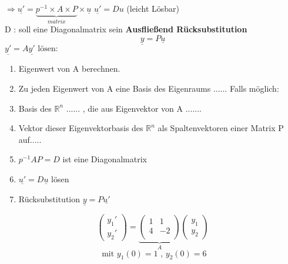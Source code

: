 $\Rightarrow \underline{u'} = 
\underbrace{p^{-1} \times A \times P}_{matrix} \times \underline{u} $
$\underline{u'} = D u$ (leicht Lösbar) \\
D : soll eine Diagonalmatrix sein
\textbf{Ausfließend Rücksubstitution}\\
$$\underline{y} = P \underline{u} $$
$ \underline{y'} = A \underline{y'} \text{ lösen: } $
\begin{enumerate}
\item Eigenwert von A berechnen.
\item Zu jeden Eigenwert von A eine Basis des Eigenraums ...... Falls möglich:
\item Basis des $\mathbb{R}^n$ ...... , die aus Eigenvektor von A .......
\item Vektor dieser Eigenvektorbasis  des $\mathbb{R}^n$ als Spaltenvektoren einer Matrix P auf.....
\item $p^{-1}AP=D$ ist eine Diagonalmatrix 
\item $\underline{u'} = D \underline{u}$ lösen
\item  Rücksubstitution $\underline{y} = P \underline{u'}$
\end{enumerate}
\begin{example}
\[
\begin{pmatrix}
y_1'\\
y_2'
\end{pmatrix} =
\underbrace{\begin{pmatrix}
1 & 1\\
4 & -2\\
\end{pmatrix}}_{A}
\begin{pmatrix}
y_1\\
y_2
\end{pmatrix}
\]
\[ \text{ mit } y_1(0) = 1 \text{ , } y_2(0) = 6 \]
\end{example} 
